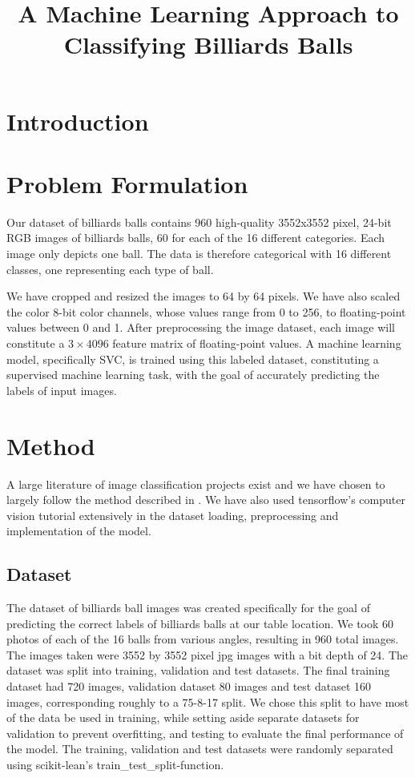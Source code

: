 \documentclass{article}
\begin{document}

\title{A Machine Learning Approach to Classifying Billiards Balls}
\maketitle

\section{Introduction}

\section{Problem Formulation}
\label{sec:problem_formulation}
Our dataset of billiards balls contains 960 high-quality 3552x3552 pixel, 24-bit RGB images of billiards balls, 60 for each of the 16 different categories. 
Each image only depicts one ball. The data is therefore categorical with 16 different classes, one representing each type of ball.


We have cropped and resized the images to 64 by 64 pixels. We have also scaled the color 8-bit color channels, whose values range from 0 to 256, 
to floating-point values between 0 and 1. After preprocessing the image dataset, each image will constitute a $3\times 4096$ feature matrix of floating-point values. 
A machine learning model, specifically SVC, is trained using this labeled dataset, constituting a supervised machine learning task, with the goal of accurately predicting the labels of input images. 

\section{Method}
\label{sec:method}
A large literature of image classification projects exist and we have chosen to largely follow the method described in \cite{unknownMachineLearningApproach2023}.
We have also used tensorflow's computer vision tutorial extensively in the dataset loading, preprocessing and implementation of the model.\cite{ComputerVisionTensorFlow}

\subsection{Dataset}
\label{sec:dataset}
The dataset of billiards ball images was created specifically for the goal of predicting the correct labels of billiards balls at our table location.
We took 60 photos of each of the 16 balls from various angles, resulting in 960 total images. The images taken were 3552 by 3552 pixel jpg images 
with a bit depth of 24. The dataset was split into training, validation and test datasets. The final training dataset had 720 images, 
validation dataset 80 images and test dataset 160 images, corresponding roughly to a 75-8-17 split. We chose this split to have most of the data 
be used in training, while setting aside separate datasets for validation to prevent overfitting, and testing to evaluate the final 
performance of the model. \cite{josephOptimalRatioData2022} The training, validation and test datasets were randomly separated using scikit-lean's train\_test\_split-function.
\end{document}

